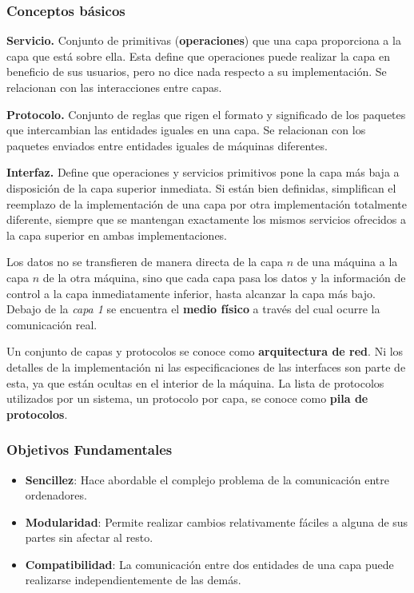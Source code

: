 \documentclass[10pt,a4paper]{article}
\begin{document}
\subsubsection{Conceptos básicos}
\begin{description}
\item \textbf{Servicio.} Conjunto de primitivas (\textbf{operaciones}) que una capa proporciona a la capa que está sobre ella. Esta define que operaciones puede realizar la capa en beneficio de sus usuarios, pero no dice nada respecto a su implementación. Se relacionan con las interacciones entre capas.
\item \textbf{Protocolo.} Conjunto de reglas que rigen el formato y significado de los paquetes que intercambian las entidades iguales en una capa. Se relacionan con los paquetes enviados entre entidades iguales de máquinas diferentes.
\item \textbf{Interfaz.} Define que operaciones y servicios primitivos pone la capa más baja a disposición de la capa superior inmediata. Si están bien definidas, simplifican el reemplazo de la implementación de una capa por otra implementación totalmente diferente, siempre que se mantengan exactamente los mismos servicios ofrecidos a la capa superior en ambas implementaciones.
\end{description}

Los datos no se transfieren de manera directa de la capa $n$ de una máquina a la capa $n$ de la otra máquina, sino que cada capa pasa los datos y la información de control a la capa inmediatamente inferior, hasta alcanzar la capa más bajo. Debajo de la \textit{capa 1} se encuentra el \textbf{medio físico} a través del cual ocurre la comunicación real.

Un conjunto de capas y protocolos se conoce como \textbf{arquitectura de red}. Ni los detalles de la implementación ni las especificaciones de las interfaces son parte de esta, ya que están ocultas en el interior de la máquina. La lista de protocolos utilizados por un sistema, un protocolo por capa, se conoce como \textbf{pila de protocolos}.

\subsubsection{Objetivos Fundamentales}
\begin{itemize}
\item \textbf{Sencillez}: Hace abordable el complejo problema de la comunicación entre ordenadores.
\item \textbf{Modularidad}: Permite realizar cambios relativamente fáciles a alguna de sus partes sin afectar al resto.
\item \textbf{Compatibilidad}: La comunicación entre dos entidades de una capa puede realizarse independientemente de las demás.
\end{itemize}
\end{document}
